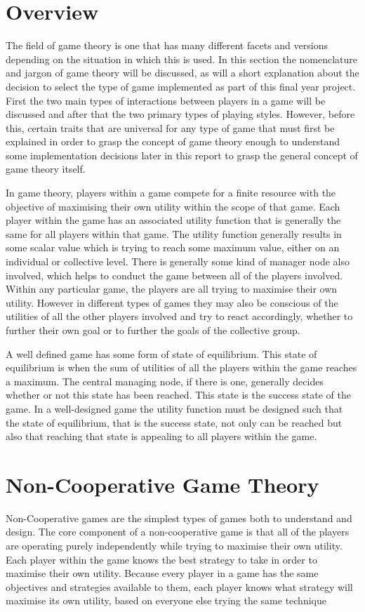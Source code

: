 \documentclass[a4paper, notitlepage]{report}
\begin{document}
\section{Overview}
\label{sec:org0f313c2}
The field of game theory is one that has many different facets and versions
depending on the situation in which this is used. In this section the
nomenclature and jargon of game theory will be discussed, as will a short
explanation about the decision to select the type of game implemented as part of
this final year project. First the two main types of interactions between
players in a game will be discussed and after that the two primary types of
playing styles. However, before this, certain traits that are universal for any
type of game that must first be explained in order to grasp the concept of game
theory enough to understand some implementation decisions later in this report
to grasp the general concept of game theory itself.

In game theory, players within a game compete for a finite resource with the
objective of maximising their own utility within the scope of that game. Each
player within the game has an associated utility function that is generally the
same for all players within that game. The utility function generally results in
some scalar value which is trying to reach some maximum value, either on an
individual or collective level. There is generally some kind of manager node
also involved, which helps to conduct the game between all of the players
involved. Within any particular game, the players are all trying to maximise
their own utility. However in different types of games they may also be
conscious of the utilities of all the other players involved and try to react
accordingly, whether to further their own goal or to further the goals of the
collective group.

A well defined game has some form of state of equilibrium. This state of
equilibrium is when the sum of utilities of all the players within the game
reaches a maximum. The central managing node, if there is one, generally decides
whether or not this state has been reached. This state is the success state of
the game. In a well-designed game the utility function must be designed such
that the state of equilibrium, that is the success state, not only can be
reached but also that reaching that state is appealing to all players within the
game.
\section{Non-Cooperative Game Theory}
\label{sec:org7f086cd}
Non-Cooperative games are the simplest types of games both to understand and
design. The core component of a non-cooperative game is that all of the players
are operating purely independently while trying to maximise their own utility.
Each player within the game knows the best strategy to take in order to maximise
their own utility. Because every player in a game has the same objectives and
strategies available to them, each player knows what strategy will maximise its
own utility, based on everyone else trying the same technique
\end{document}
